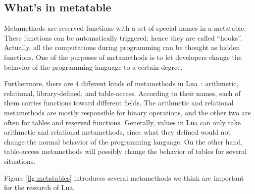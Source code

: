 \subsection{What's in metatable}
Metamethods are reserved functions with a set of special names in a metatable. These functions can be automatically triggered; hence they are called ``hooks''. Actually, all the computations during programming can be thought as hidden functions. One of the purposes of metamethods is to let developers change the behavior of the programming language to a certain degree.

Furthermore, there are 4 different kinds of metamethods in Lua~\cite{PIL}: arithmetic, relational, library-defined, and table-access. According to their names, each of them carries functions toward different fields. The arithmetic and relational metamethods are mostly responsible for binary operations, and the other two are often for tables and reserved functions. Generally, values in Lua can only take arithmetic and relational metamethods, since what they defined would not change the normal behavior of the programming language. On the other hand, table-access metamethods will possibly change the behavior of tables for several situations.

Figure \ref{fig:metatables} introduces several metamethods we think are important for the research of Lua.


